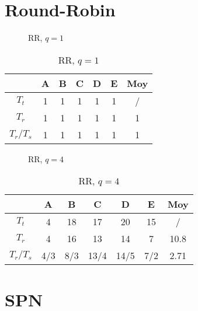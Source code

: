 \documentclass[a4, 11pt]{article}
\begin{document}
   \section*{Round-Robin}
      \begin{figure}[h!]
         \centering
         
         \caption{RR, $q=1$}
         \label{fig:rr}
      \end{figure}

      \begin{table}[ht!]
         \centering
         \begin{tabular}{c|c|c|c|c|c|c}
            & \textbf{A} & \textbf{B} & \textbf{C} & \textbf{D} & \textbf{E} & \textbf{Moy} \\ \hline
            $T_t$   & 1 & 1 & 1 & 1 & 1 & / \\ \hline
            $T_r$   & 1 & 1 & 1 & 1 & 1 & 1 \\ \hline
            $T_r / T_s$ & 1 & 1 & 1 & 1 & 1 & 1 \\
         \end{tabular}
         \caption{RR, $q=1$}
         \label{tab:rrq1}
      \end{table}

      \begin{figure}[h!]
         \centering
         
         \caption{RR, $q=4$}
         \label{fig:rrq4}
      \end{figure}

      \begin{table}[ht!]
         \centering
         \begin{tabular}{c|c|c|c|c|c|c}
            & \textbf{A} & \textbf{B} & \textbf{C} & \textbf{D} & \textbf{E} & \textbf{Moy} \\ \hline
            $T_t$   & 4 & 18 & 17 & 20 & 15 & / \\ \hline
            $T_r$   & 4 & 16 & 13 & 14 & 7 & 10.8 \\ \hline
            $T_r / T_s$ & 4/3 & 8/3 & 13/4 & 14/5 & 7/2 & 2.71 \\
         \end{tabular}
         \caption{RR, $q=4$}
         \label{tab:rrq4}
      \end{table}

      \newpage

   \section*{SPN}
\end{document}
